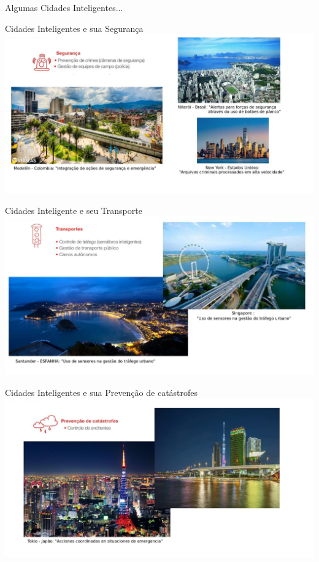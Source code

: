 \documentclass{beamer}
\begin{document}
\begin{frame}{}
\begin{center}
Algumas Cidades Inteligentes... 
\end{center}


\end{frame}





\begin{frame}{Cidades Inteligentes e sua Segurança}
\includegraphics[width=1.1\textwidth]{img/reto__1.jpeg} 
\end{frame}

\begin{frame}{Cidades Inteligente e seu Transporte}
\includegraphics[width=1\textwidth]{img/reto__2.jpeg}  
\end{frame}


\begin{frame}{Cidades Inteligentes e sua Prevenção de catástrofes}
\includegraphics[width=1\textwidth]{img/reto__3.jpeg}  
\end{frame}
\end{document}
